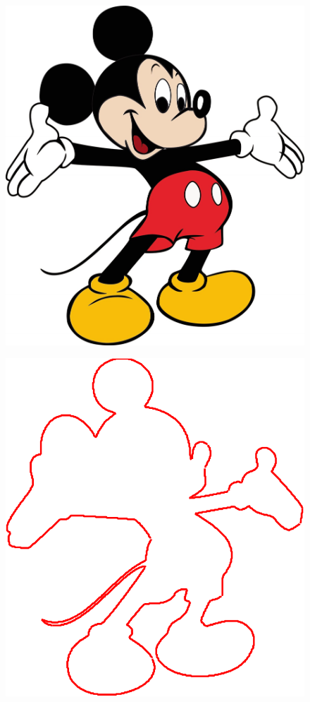 \documentclass[10pt]{article}
\begin{document}
\begin{figure}

\centering
\begin{minipage}[t]{.24\textwidth}
\centering
\vspace{0pt}
    \includegraphics[scale=0.09]{mickey.jpg}
    \label{fig:cornerdet}
\end{minipage}
\begin{minipage}[t]{.24\textwidth}
\centering
\vspace{0pt}
    \includegraphics[scale=0.3]{mickey1-crop.pdf}

\end{minipage}
\end{figure}
\end{document}

